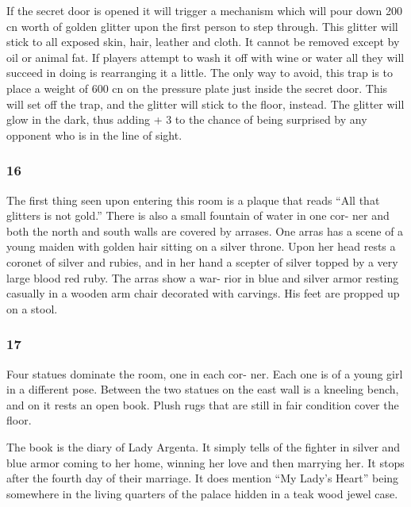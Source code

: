 \documentclass[palace_of_the_silver_princess]{subfiles}
\begin{document}
If the secret door is opened it will trigger a mechanism which will pour
down 200 cn worth of golden glitter upon the first person to step
through. This glitter will stick to all exposed skin, hair, leather and
cloth. It cannot be removed except by oil or animal fat. If players
attempt to wash it off with wine or water all they will succeed in doing
is rearranging it a little. The only way to avoid, this trap is to place
a weight of 600 cn on the pressure plate just inside the secret door.
This will set off the trap, and the glitter will stick to the floor,
instead. The glitter will glow in the dark, thus adding + 3 to the
chance of being surprised by any opponent who is in the line of sight.
    
\subsubsection{16}
\begin{quotebox}
    The first thing seen upon entering this room is a plaque that reads
    “All that glitters is not gold.” There is also a small fountain of
    water in one cor- ner and both the north and south walls are covered
    by arrases. One arras has a scene of a young maiden with golden hair
    sitting on a silver throne. Upon her head rests a coronet of silver
    and rubies, and in her hand a scepter of silver topped by a very
    large blood red ruby. The arras show a war- rior in blue and silver
    armor resting casually in a wooden arm chair decorated with
    carvings. His feet are propped up on a stool.
\end{quotebox}

\subsubsection{17}
\begin{quotebox}
    Four statues dominate the room, one in each cor- ner. Each one is of
    a young girl in a different pose. Between the two statues on the
    east wall is a kneeling bench, and on it rests an open book. Plush
    rugs that are still in fair condition cover the floor.
\end{quotebox}

The book is the diary of Lady Argenta. It simply tells of the fighter in
silver and blue armor coming to her home, winning her love and then
marrying her. It stops after the fourth day of their marriage. It does
mention “My Lady’s Heart” being somewhere in the living quarters of the
palace hidden in a teak wood jewel case.
\end{document}
